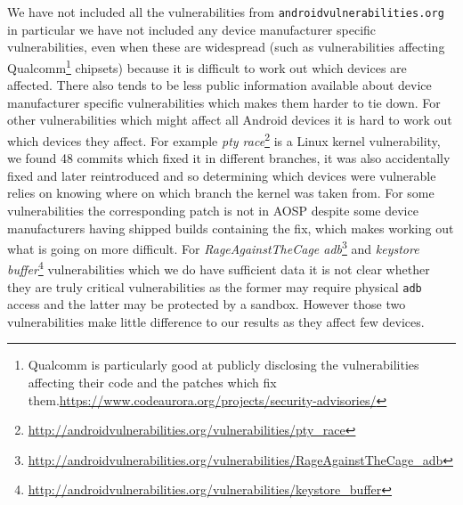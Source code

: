 \documentclass[conference,a4paper,twoside]{IEEEtran}
\newcommand{\avo}{\texttt{androidvulnerabilities.org}}
\begin{document}
We have not included all the vulnerabilities from \avo\, in particular we have not included any device manufacturer specific vulnerabilities, even when these are widespread (such as vulnerabilities affecting Qualcomm\footnote{Qualcomm is particularly good at publicly disclosing the vulnerabilities affecting their code and the patches which fix them.\url{https://www.codeaurora.org/projects/security-advisories/}} chipsets) because it is difficult to work out which devices are affected.
There also tends to be less public information available about device manufacturer specific vulnerabilities which makes them harder to tie down.
For other vulnerabilities which might affect all Android devices it is hard to work out which devices they affect.
For example \emph{pty race}\footnote{\url{http://androidvulnerabilities.org/vulnerabilities/pty_race}} is a Linux kernel vulnerability, we found 48 commits which fixed it in different branches, it was also accidentally fixed and later reintroduced and so determining which devices were vulnerable relies on knowing where on which branch the kernel was taken from.
For some vulnerabilities the corresponding patch is not in AOSP despite some device manufacturers having shipped builds containing the fix, which makes working out what is going on more difficult.
For \emph{RageAgainstTheCage adb}\footnote{\url{http://androidvulnerabilities.org/vulnerabilities/RageAgainstTheCage_adb}} and \emph{keystore buffer}\footnote{\url{http://androidvulnerabilities.org/vulnerabilities/keystore_buffer}} vulnerabilities which we do have sufficient data it is not clear whether they are truly critical vulnerabilities as the former may require physical \texttt{adb} access and the latter may be protected by a sandbox.
However those two vulnerabilities make little difference to our results as they affect few devices.
\end{document}
